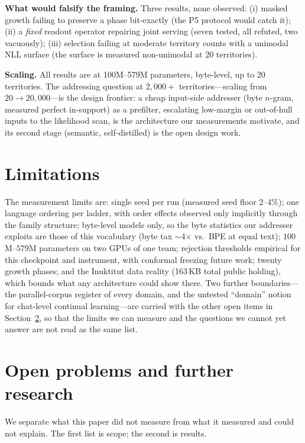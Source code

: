 \documentclass[11pt]{article}
\theoremstyle{definition}\newtheorem{definition}{Definition}
\theoremstyle{remark}\newtheorem{remark}{Remark}
\begin{document}
\textbf{What would falsify the framing.} Three results, none observed: (i) masked
growth failing to preserve a phase bit-exactly (the P5 protocol would catch it); (ii) a
\emph{fixed} readout operator repairing joint serving (seven tested, all refuted, two
vacuously); (iii) selection failing at moderate territory counts with a unimodal NLL
surface (the surface is measured non-unimodal at 20 territories).

\textbf{Scaling.} All results are at 100M--579M parameters, byte-level, up to 20
territories. The addressing question at $2{,}000{+}$ territories---scaling from
$20 \to 20{,}000$---is the design frontier: a cheap input-side addresser
(byte $n$-gram, measured perfect in-support) as a prefilter, escalating low-margin or
out-of-hull inputs to the likelihood scan, is the architecture our measurements
motivate, and its second stage (semantic, self-distilled) is the open design work.

\section{Limitations}
\label{sec:limits}

The measurement limits are: single seed per run (measured seed floor 2--4\%); one
language ordering per ladder, with order effects observed only implicitly through the
family structure; byte-level models only, so the byte statistics our addresser exploits
are those of this vocabulary (byte tax $\sim$4$\times$ vs.\ BPE at equal text);
$100$M--$579$M parameters on two GPUs of one team; rejection thresholds empirical for this
checkpoint and instrument, with conformal freezing future work; twenty growth phases; and
the Inuktitut data reality (163\,KB total public holding), which bounds what any
architecture could show there. Two further boundaries---the parallel-corpus register of
every domain, and the untested ``domain'' notion for chat-level continual learning---are
carried with the other open items in Section~\ref{sec:open}, so that the limits we can
measure and the questions we cannot yet answer are not read as the same list.

\section{Open problems and further research}
\label{sec:open}

We separate what this paper did not measure from what it measured and could not explain.
The first list is scope; the second is results.
\end{document}
